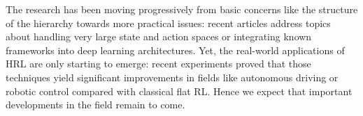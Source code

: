 \documentclass{article}
\begin{document}
The research has been moving progressively from basic concerns like the structure of the hierarchy towards more practical issues: recent articles address topics about handling very large state and action spaces or integrating known frameworks into deep learning architectures. Yet, the real-world applications of HRL are only starting to emerge: recent experiments proved that those techniques yield significant improvements in fields like autonomous driving or robotic control compared with classical flat RL. Hence we expect that important developments in the field remain to come.

\small

\setlength{\bibsep}{2.5pt}

\end{document}
